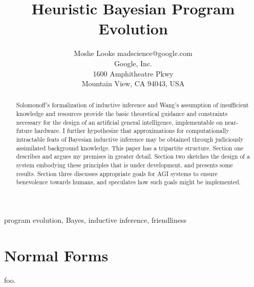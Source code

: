 \documentclass[twoside,11pt]{article}
\begin{document}
 \sloppy
\title{Heuristic Bayesian Program Evolution}
\author{\name Moshe Looks \email madscience@google.com \\
       \addr Google, Inc. \\
       1600 Amphitheatre Pkwy \\
       Mountain View, CA 94043, USA}
\maketitle

\begin{abstract}
  Solomonoff's formalization of inductive inference and Wang's assumption of
  insufficient knowledge and resources provide the basic theoretical guidance
  and constraints necessary for the design of an artificial general
  intelligence, implementable on near-future hardware. I further hypothesize
  that approximations for computationally intractable feats of Bayesian
  inductive inference may be obtained through judiciously assimilated
  background knowledge. This paper has a tripartite structure. Section one
  describes and argues my premises in greater detail. Section two sketches the
  design of a system embodying these principles that is under development, and
  presents some results. Section three discusses appropriate goals for AGI
  systems to ensure benevolence towards humans, and speculates how such goals
  might be implemented.
\end{abstract}

\begin{keywords}
  program evolution, Bayes, inductive inference, friendliness
\end{keywords}

\section{Normal Forms}

foo.



\end{document}
